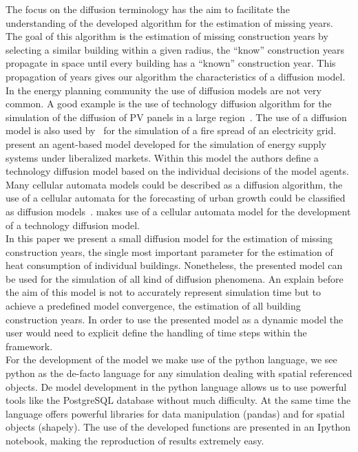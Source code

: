 The focus on the diffusion terminology has the aim to facilitate the
understanding of the developed algorithm for the estimation of missing years.
The goal of this algorithm is the estimation of missing construction years by
selecting a similar building within a given radius, the ``know'' construction
years propagate in space until every building has a ``known'' construction
year. This propagation of years gives our algorithm the characteristics of a
diffusion model.\\

In the energy planning community the use of diffusion models are not very
common. A good example is the use of technology diffusion algorithm for the
simulation of the diffusion of PV panels in a large region~\citep{Linder.2013}.
The use of a diffusion model is also used by~\citet{Bagchi.2013} for the
simulation of a fire spread of an electricity grid. 
\citet{Wittmann.2007} present an agent-based model developed for the simulation
of energy supply systems under liberalized markets. Within this model the
authors define a technology diffusion model based on the individual decisions
of the model agents.
%
Many cellular automata models could be described as a diffusion algorithm, the
use of a cellular automata for the forecasting of urban growth could be
classified as diffusion models~\citep{Han.2009,Batty.1999}. \citet{Guseo.2008}
makes use of a cellular automata model for the development of a technology
diffusion model.\\

In this paper we present a small diffusion model for the estimation of missing
construction years, the single most important parameter for the estimation of
heat consumption of individual buildings. Nonetheless, the presented model can
be used for the simulation of all kind of diffusion phenomena. An explain
before the aim of this model is not to accurately represent simulation time but
to achieve a predefined model convergence, the estimation of all building
construction years. In order to use the presented model as a dynamic model the
user would need to explicit define the handling of time steps within the
framework.\\

For the development of the model we make use of the python language, we see
python as the de-facto language for any simulation dealing with spatial
referenced objects. De model development in the python language allows us to
use powerful tools like the PostgreSQL database without much difficulty. At the
same time the language offers powerful libraries for data manipulation
(pandas) and for spatial objects (shapely). The use of the developed functions
are presented in an Ipython notebook, making the reproduction of results
extremely easy.\\

